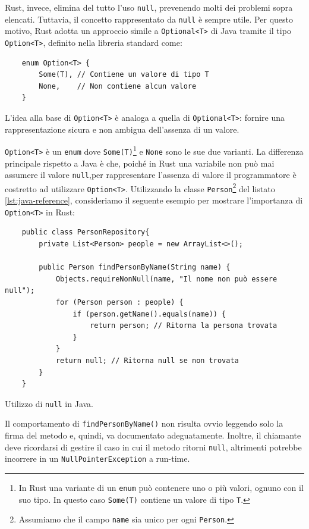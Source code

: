 Rust, invece, elimina del tutto l'uso \texttt{null}, prevenendo molti dei problemi sopra elencati. Tuttavia, il concetto rappresentato da \texttt{null} è sempre utile. Per questo motivo, Rust adotta un approccio simile a \texttt{Optional<T>} di Java tramite il tipo \texttt{Option<T>}, definito nella libreria standard come:
\begin{verbatim}
    enum Option<T> {
        Some(T), // Contiene un valore di tipo T
        None,    // Non contiene alcun valore
    }
\end{verbatim}
L'idea alla base di \texttt{Option<T>} è analoga a quella di \texttt{Optional<T>}: fornire una rappresentazione sicura e non ambigua dell'assenza di un valore.

\texttt{Option<T>} è un \texttt{enum} dove \texttt{Some(T)}\footnote{In Rust una variante di un \texttt{enum} può contenere uno o più valori, ognuno con il suo tipo. In questo caso \texttt{Some(T)} contiene un valore di tipo \texttt{T}.} e \texttt{None} sono le sue due varianti. La differenza principale rispetto a Java è che, poiché in Rust una variabile non può mai assumere il valore \texttt{null},per rappresentare l'assenza di valore il programmatore è costretto ad utilizzare \texttt{Option<T>}. Utilizzando la classe \texttt{Person}\footnote{Assumiamo che il campo \texttt{name} sia unico per ogni \texttt{Person}.} del listato \ref{lst:java-reference}, consideriamo il seguente esempio per mostrare l'importanza di \texttt{Option<T>} in Rust: 
\begin{listing}[h]
    \begin{verbatim}
    public class PersonRepository{
        private List<Person> people = new ArrayList<>();

        public Person findPersonByName(String name) {
            Objects.requireNonNull(name, "Il nome non può essere null");
            for (Person person : people) {
                if (person.getName().equals(name)) {
                    return person; // Ritorna la persona trovata
                }
            }
            return null; // Ritorna null se non trovata
        }
    }
    \end{verbatim}
    \caption{Utilizzo di \texttt{null} in Java.}
    \label{lst:java-optional}
\end{listing}

Il comportamento di \texttt{findPersonByName()} non risulta ovvio leggendo solo la firma del metodo e, quindi, va documentato adeguatamente. Inoltre, il chiamante deve ricordarsi di gestire il caso in cui il metodo ritorni \texttt{null}, altrimenti potrebbe incorrere in un \texttt{NullPointerException} a run-time. 

